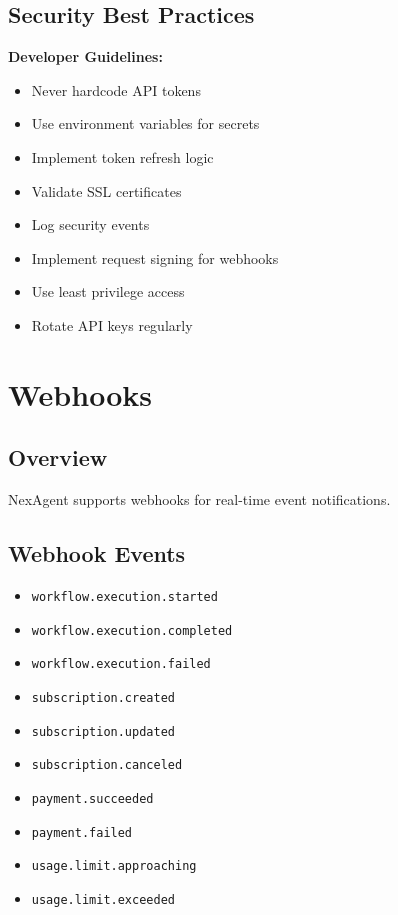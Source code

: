 \documentclass[11pt,a4paper]{report}
\begin{document}
\section{Security Best Practices}

\begin{infobox}
\textbf{Developer Guidelines:}
\begin{itemize}[leftmargin=*]
    \item Never hardcode API tokens
    \item Use environment variables for secrets
    \item Implement token refresh logic
    \item Validate SSL certificates
    \item Log security events
    \item Implement request signing for webhooks
    \item Use least privilege access
    \item Rotate API keys regularly
\end{itemize}
\end{infobox}

\newpage

\chapter{Webhooks}

\section{Overview}

NexAgent supports webhooks for real-time event notifications.

\section{Webhook Events}

\begin{itemize}[leftmargin=*]
    \item \texttt{workflow.execution.started}
    \item \texttt{workflow.execution.completed}
    \item \texttt{workflow.execution.failed}
    \item \texttt{subscription.created}
    \item \texttt{subscription.updated}
    \item \texttt{subscription.canceled}
    \item \texttt{payment.succeeded}
    \item \texttt{payment.failed}
    \item \texttt{usage.limit.approaching}
    \item \texttt{usage.limit.exceeded}
\end{itemize}
\end{document}
